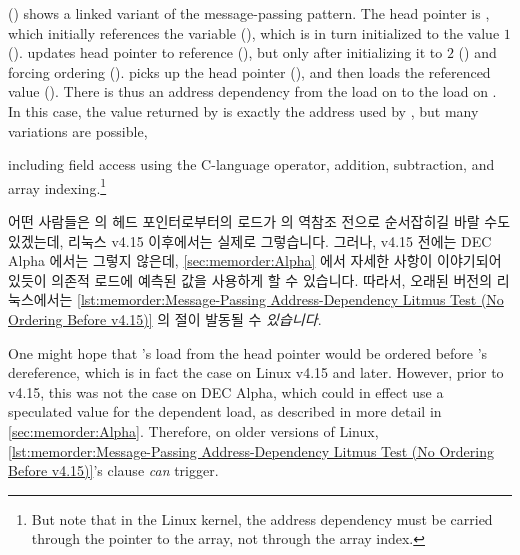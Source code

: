 \begin{fcvref}
()
shows a linked variant of the message-passing pattern.
The head pointer is , which initially
references the  variable  (), which is in turn
initialized to the value $1$ ().
 updates head pointer  to reference  (),
but only after initializing it to $2$ () and forcing ordering
().
 picks up the head pointer  (), and then loads
the referenced value ().
There is thus an address dependency from the load on  to the
load on .
In this case, the value returned by  is exactly the address
used by , but many variations are possible,
\end{fcvref}
including field access using the C-language \co{->} operator,
addition, subtraction, and array indexing.\footnote{
	But note that in the Linux kernel, the address dependency must
	be carried through the pointer to the array, not through the
	array index.}

\fi

\begin{fcvref}
어떤 사람들은  의 헤드 포인터로부터의 로드가  의
역참조 전으로 순서잡히길 바랄 수도 있겠는데, 리눅스 v4.15 이후에서는 실제로
그렇습니다.
그러나, v4.15 전에는 DEC Alpha 에서는 그렇지 않은데,
\cref{sec:memorder:Alpha} 에서 자세한 사항이 이야기되어 있듯이 의존적 로드에
예측된 값을 사용하게 할 수 있습니다.
따라서, 오래된 버전의 리눅스에서는
\cref{lst:memorder:Message-Passing Address-Dependency Litmus Test (No Ordering
Before v4.15)} 의  절이 발동될 수 \emph{있습니다}.
\end{fcvref}

\iffalse

\begin{fcvref}
One might hope that 's load from the head pointer would be ordered
before 's dereference, which is in fact the case on Linux v4.15
and later.
However, prior to v4.15, this was not the case on DEC Alpha, which could
in effect use a speculated value for the dependent load, as described
in more detail in \cref{sec:memorder:Alpha}.
Therefore, on older versions of Linux,
\cref{lst:memorder:Message-Passing Address-Dependency Litmus Test (No Ordering Before v4.15)}'s
 clause \emph{can} trigger.
\end{fcvref}

